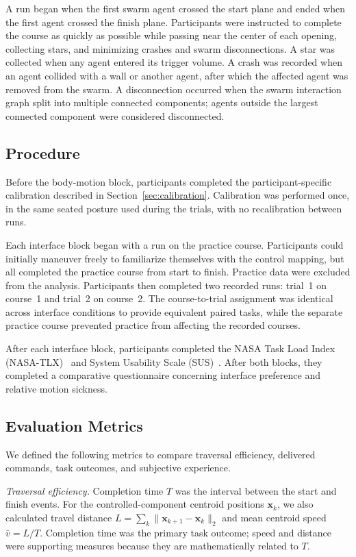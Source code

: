 \documentclass[conference, a4paper]{IEEEtran}
\begin{document}
A run began when the first swarm agent crossed the start plane and ended when
the first agent crossed the finish plane. Participants were instructed to
complete the course as quickly as possible while passing near the center of
each opening, collecting stars, and minimizing crashes and swarm
disconnections. A star was collected when any agent entered its trigger
volume. A crash was recorded when an agent collided with a wall or another agent, after which the affected agent was removed from the swarm. A disconnection
occurred when the swarm interaction graph split into multiple connected
components; agents outside the largest connected component were considered
disconnected.

\subsection{Procedure}
\label{sec:procedure}

Before the body-motion block, participants completed the participant-specific
calibration described in Section~\ref{sec:calibration}. Calibration was
performed once, in the same seated posture used during the trials, with no
recalibration between runs.

Each interface block began with a run on the practice course. Participants
could initially maneuver freely to familiarize themselves with the control
mapping, but all completed the practice course from start to finish. Practice
data were excluded from the analysis. Participants then completed two recorded
runs: trial~1 on course~1 and trial~2 on course~2. The course-to-trial
assignment was identical across interface conditions to provide equivalent
paired tasks, while the separate practice course prevented practice from
affecting the recorded courses.

After each interface block, participants completed the NASA Task Load Index
(NASA-TLX)~\cite{hart1988nasatlx} and System Usability Scale
(SUS)~\cite{brooke1996sus}. After both blocks, they completed a comparative
questionnaire concerning interface preference and relative motion sickness.

\subsection{Evaluation Metrics}

We defined the following metrics to compare traversal efficiency, delivered
commands, task outcomes, and subjective experience.

\emph{Traversal efficiency.}
Completion time $T$ was the interval between the start and finish events.
For the controlled-component centroid positions $\mathbf{x}_k$, we also
calculated travel distance
$L=\sum_k\lVert\mathbf{x}_{k+1}-\mathbf{x}_k\rVert_2$ and mean centroid speed
$\bar{v}=L/T$. Completion time was the primary task outcome; speed and distance
were supporting measures because they are mathematically related to $T$.
\end{document}
